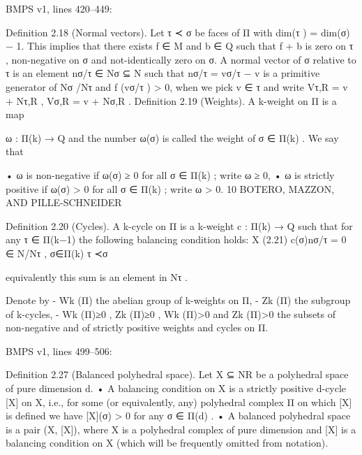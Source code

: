\documentclass[
  11pt,
]{article}
\newenvironment{Shaded}{}{}
\newcommand{\NormalTok}[1]{#1}
\begin{document}
BMPS v1, lines 420--449:

\begin{Shaded}
\begin{Highlighting}[]
\NormalTok{Definition 2.18 (Normal vectors). Let τ ≺ σ be faces of Π with dim(τ ) = dim(σ) − 1. This}
\NormalTok{implies that there exists f ∈ M and b ∈ Q such that f + b is zero on τ , non{-}negative on σ and}
\NormalTok{not{-}identically zero on σ. A normal vector of σ relative to τ is an element}
\NormalTok{                                                 nσ/τ ∈ Nσ ⊆ N}
\NormalTok{such that nσ/τ = vσ/τ − v is a primitive generator of Nσ /Nτ and f (vσ/τ ) \textgreater{} 0, when we pick v ∈ τ}
\NormalTok{and write Vτ,R = v + Nτ,R , Vσ,R = v + Nσ,R .}
\NormalTok{Definition 2.19 (Weights). A k{-}weight on Π is a map}

\NormalTok{                                                   ω : Π(k) → Q}
\NormalTok{and the number ω(σ) is called the weight of σ ∈ Π(k) . We say that}

\NormalTok{      • ω is non{-}negative if ω(σ) ≥ 0 for all σ ∈ Π(k) ; write ω ≥ 0,}
\NormalTok{      • ω is strictly positive if ω(σ) \textgreater{} 0 for all σ ∈ Π(k) ; write ω \textgreater{} 0.}
\NormalTok{10                             BOTERO, MAZZON, AND PILLE{-}SCHNEIDER}


\NormalTok{Definition 2.20 (Cycles). A k{-}cycle on Π is a k{-}weight c : Π(k) → Q such that for any τ ∈ Π(k−1)}
\NormalTok{the following balancing condition holds:}
\NormalTok{                                    X}
\NormalTok{(2.21)                                   c(σ)nσ/τ = 0 ∈ N/Nτ ,}
\NormalTok{                                    σ∈Π(k)}
\NormalTok{                                     τ ≺σ}

\NormalTok{equivalently this sum is an element in Nτ .}

\NormalTok{     Denote by}
\NormalTok{       {-} Wk (Π) the abelian group of k{-}weights on Π,}
\NormalTok{       {-} Zk (Π) the subgroup of k{-}cycles,}
\NormalTok{       {-} Wk (Π)≥0 , Zk (Π)≥0 , Wk (Π)\textgreater{}0 and Zk (Π)\textgreater{}0 the subsets of non{-}negative and of strictly}
\NormalTok{         positive weights and cycles on Π.}
\end{Highlighting}
\end{Shaded}

BMPS v1, lines 499--506:

\begin{Shaded}
\begin{Highlighting}[]
\NormalTok{Definition 2.27 (Balanced polyhedral space). Let X ⊆ NR be a polyhedral space of pure}
\NormalTok{dimension d.}
\NormalTok{     • A balancing condition on X is a strictly positive d{-}cycle [X] on X, i.e., for some (or}
\NormalTok{       equivalently, any) polyhedral complex Π on which [X] is defined we have [X](σ) \textgreater{} 0 for any}
\NormalTok{       σ ∈ Π(d) .}
\NormalTok{     • A balanced polyhedral space is a pair (X, [X]), where X is a polyhedral complex of pure}
\NormalTok{       dimension and [X] is a balancing condition on X (which will be frequently omitted from}
\NormalTok{       notation).}
\end{Highlighting}
\end{Shaded}
\end{document}
